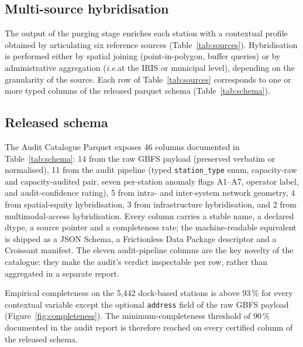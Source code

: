 \documentclass[11pt,a4paper]{article}
\newcommand{\ie}{\emph{i.e.}}
\begin{document}
\subsection{Multi-source hybridisation}
The output of the purging stage enriches each station with a
contextual profile obtained by articulating six reference sources
(Table~\ref{tab:sources}). Hybridisation is performed either by
spatial joining (point-in-polygon, buffer queries) or by
administrative aggregation (\ie at the IRIS or municipal level),
depending on the granularity of the source. Each row of
Table~\ref{tab:sources} corresponds to one or more typed columns
of the released parquet schema (Table~\ref{tab:schema}).


\subsection{Released schema}
The Audit Catalogue Parquet exposes 46 columns documented in
Table~\ref{tab:schema}: 14 from the raw GBFS payload (preserved
verbatim or normalised), 11 from the audit pipeline (typed
\texttt{station\_type} enum, capacity-raw and capacity-audited
pair, seven per-station anomaly flags A1--A7, operator label, and
audit-confidence rating), 5 from intra- and inter-system network
geometry, 4 from spatial-equity hybridisation, 3 from infrastructure
hybridisation, and 2 from multimodal-access hybridisation. Every
column carries a stable name, a declared dtype, a source pointer
and a completeness rate; the machine-readable equivalent is shipped
as a JSON Schema, a Frictionless Data Package descriptor and a
Croissant manifest. The eleven audit-pipeline columns are the
key novelty of the catalogue: they make the audit's verdict
inspectable per row, rather than aggregated in a separate report.


Empirical completeness on the 5{,}442 dock-based stations is
above $93\,\%$ for every contextual variable except the optional
\texttt{address} field of the raw GBFS payload
(Figure~\ref{fig:completeness}). The minimum-completeness threshold
of $90\,\%$ documented in the audit report is therefore reached on
every certified column of the released schema.

\end{document}
